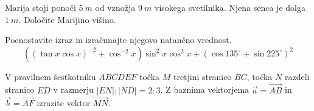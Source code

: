 \documentclass[addpoints]{exam}
\begin{document}
\begin{questions}

    \question[2]
        Marija stoji ponoči $5~m$ od vznožja $9~m$ visokega svetilnika. Njena senca je dolga $1~m$.
        Določite Marijino višino.







    \question[6]
    Poenostavite izraz in izračunajte njegovo natančno vrednost. 
    $$\displaystyle \left(\left(\tan{x}\cos{x}\right)^{-2}+\cos^{-2}{x}\right)\sin^2{x}\cos^2{x} + \left(\cos{135^\circ}+\sin{225^\circ}\right)^2$$

       




       



    \question[3]
    V pravilnem šestkotniku $ABCDEF$ točka $M$ tretjini stranico $BC$, točka $N$ razdeli stranico $ED$ v razmerju $|EN|:|ND|=2:3$.
    Z baznima vektorjema $\overrightarrow{a}=\overrightarrow{AB}$ in $\overrightarrow{b}=\overrightarrow{AF}$ izrazite vektor $\overrightarrow{MN}$. 


\end{questions}
\end{document}
